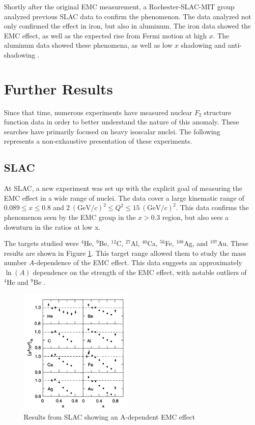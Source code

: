 Shortly after the original EMC measurement, a Rochester-SLAC-MIT group analyzed previous SLAC data to confirm the phenomenon. The data analyzed not only confirmed the effect in iron, but also in aluminum. The iron data showed the EMC effect, as well as the expected rise from Fermi motion at high $x$. The aluminum data showed these phenomena, as well as low $x$ shadowing and anti-shadowing \cite{bodek_Fe,bodek_Al,Norton}.

\section{Further Results}

Since that time, numerous experiments have measured nuclear $F_2$ structure function data in order to better understand the nature of this anomaly. These searches have primarily focused on heavy isoscalar nuclei. The following represents a non-exhaustive presentation of these experiments.

\subsection{SLAC}
At SLAC, a new experiment was set up with the explicit goal of measuring the EMC effect in a wide range of nuclei. The data cover a large kinematic range of $0.089 \le x \le 0.8$ and $2\ \left(\textrm{GeV}/c\right)^2 \le Q^2 \le 15\ \left(\textrm{GeV}/c\right)^2$. This data confirms the phenomenon seen by the EMC group in the $x>0.3$ region, but also sees a downturn in the ratios at low x. 

The targets studied were $^4$He, $^9$Be, $^{12}$C, $^{27}$Al, $^{40}$Ca, $^{56}$Fe, $^{108}$Ag, and $^{197}$Au. These results are shown in Figure \ref{gomez_results}. This target range allowed them to study the mass number $A$-dependence of the EMC effect. This data suggests an approximately $\ln\left(A\right)$ dependence on the strength of the EMC effect, with notable outliers of $^4$He and $^9$Be \cite{Arnold,Gomez}.

\begin{figure}[h]
\begin{center}
	\includegraphics[width=0.5\textwidth]{./EMC/fig/gomez.png}
	\caption{Results from SLAC showing an A-dependent EMC effect \cite{Gomez}}
	\label{gomez_results}
\end{center}
\end{figure}

